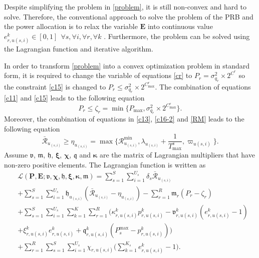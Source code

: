 \documentclass[lettersize,journal]{IEEEtran}
\begin{document}
Despite simplifying the problem in \eqref{problem}, it is still non-convex and hard to solve.
Therefore, the conventional approach to solve the problem of the PRB and the power allocation is to relax the variable $\mathbf{E}$ into continuous value $e_{r,u(s,i)}^k \in [0,1] \:\: \forall s , \forall i ,\forall r, \forall k$ \cite{lee2018dynamic,ali2018joint}.
Furthermore, the problem can be solved using the Lagrangian function and iterative algorithm.

In order to transform \eqref{problem} into a convex optimization problem in standard form, it is required to change the variable of equations \eqref{cr} to $P_r = \sigma_{q_r}^2\times 2^{C^r}$ so the constraint
\eqref{c15} is changed to
 $P_r \leq \sigma_{q_r}^2\times 2^{C^r_{\max}}$.
The combination of equations \eqref{c11} and \eqref{c15} leads to the following equation
\begin{equation} \label{pr11}
P_r\leq \zeta_r= \min\{P_{\max}, \sigma_{q_r}^2\times 2^{C^r_{\max}} \}. 
\end{equation}
Moreover, the combination of equations in \eqref{c13}, \eqref{c16-2} and \eqref{RM} leads to the following equation
\begin{equation}\label{RConstr}
\mathcal{\bar{R}}_{u_{(s,i)}}\!\!\geq\!\eta_{u_{(s,i)}}\!\!\!=\! \max\{\mathcal{R}_{u_{(s,i)}}^{\min}\!, \lambda_{u_{(s,i)}}\!\!+\frac{1}{T^s_{\max}}\!, \varpi_{u(s,i)} \}. 
\end{equation}
Assume $\boldsymbol{\mathfrak{v}}$, $\boldsymbol{\mathfrak{m}}$, $\boldsymbol{\mathfrak{h}}$, $\boldsymbol{\xi}$, $\boldsymbol{\chi}$, $\boldsymbol{\mathfrak{q}}$ and $\boldsymbol{ \kappa}$ are the matrix of Lagrangian multipliers that have non-zero positive elements. The Lagrangian function is written as
\begin{align}\label{lagrang}
&\mathcal{L}(\boldsymbol{P},\boldsymbol{E}; \boldsymbol{\mathfrak{v}}, \boldsymbol{\chi}, \boldsymbol{\mathfrak{h}}, \boldsymbol{ \xi}, \boldsymbol{ \kappa}, \boldsymbol{\mathfrak{m}})  = \sum\limits_{s=1}^{S} \sum\limits_{i=1}^{U_s}\delta_s\mathcal{\bar{R}}_{u_{(s,i)}}\nonumber\\
&+\sum\limits_{s=1}^{S} \sum\limits_{i=1}^{U_s}\mathfrak{h}_{u_{(s,i)}} (\mathcal{\bar{R}}_{u_{(s,i)}}-\eta_{u_{(s,i)}})-  \sum\limits_{r=1}^{R} \mathfrak{m}_{r} (P_{r}- \zeta_r)\nonumber\\
&+  \sum\limits_{s=1}^{S} \sum\limits_{i=1}^{U_s}\sum\limits_{k=1}^{K} \sum\limits_{r=1}^{R}\Big(\kappa^k_{r,u(s,i)}  p^k_{r,u(s,i)}\!-\! \mathfrak{v}^{k}_{r,u(s,i)} (e^{k}_{r,u(s,i)}\!-\!1) \nonumber\\
&+   \xi^{k}_{r,u(s,i)} e^{k}_{r,u(s,i)}+ \mathfrak{q}^k_{r,u(s,i)} (P^{\max}_{s}- p^k_{r,u(s,i)})\Big)\nonumber\\
&+ \sum\limits_{r=1}^{R}\sum\limits_{s=1}^{S} \sum\limits_{i=1}^{U_s}\chi_{r,u(s,i)}\Big(\sum_{k =1}^{K_s} e^{k}_{r,u(s,i)} -1\Big).
\end{align}
\end{document}
